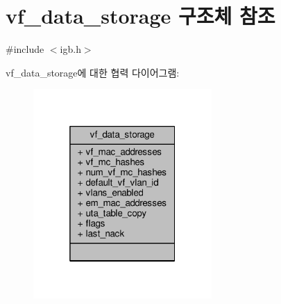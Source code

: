 \hypertarget{structvf__data__storage}{}\section{vf\+\_\+data\+\_\+storage 구조체 참조}
\label{structvf__data__storage}


{\ttfamily \#include $<$igb.\+h$>$}



vf\+\_\+data\+\_\+storage에 대한 협력 다이어그램\+:
\nopagebreak
\begin{figure}[H]
\begin{center}
\leavevmode
\includegraphics[width=193pt]{structvf__data__storage__coll__graph}
\end{center}
\end{figure}
